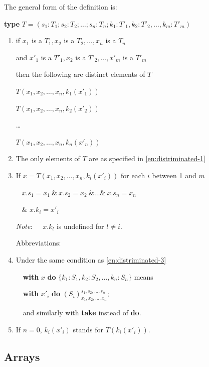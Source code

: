 \documentclass[twoside,11pt]{book}
\begin{document}
The general form of the definition is:

\quad \textbf{type} $T = (s_1: T_1; s_2: T_2; \dots ; s_n:T_n; k_1: T'_1, k_2:T'_2, \dots , k_m: T'_m)$

\begin{enumerate}[wide, nosep, label=(\arabic*)]
	\item \label{en:distriminated-1}
	if $x_1$ is a $T_1, x_2$ is a $T_2, \dots, x_n$ is a $T_n$
	
	and $x'_1$ is a $T'_1, x_2$ is a $T'_2, \dots, x'_m$ is a $T'_m$
	
	then the following are distinct elements of $T$
	
	$T(x_1, x_2, \dots, x_n, k_1(x'_1))$
	
	$T(x_1, x_2, \dots, x_n, k_2(x'_2))$
	
	\quad \dots
	
	$T(x_1, x_2, \dots, x_n, k_n(x'_n))$

	\item The only elements of $T$ are as specified in \ref{en:distriminated-1}
	
	\item\label{en:distriminated-3}
	If $x = T(x_1, x_2, \dots, x_n, k_i(x'_i))$ for each $i$ between 1 and $m$
	
	\qquad~ $x.s_1 = x_1\ \&\ x.s_2 = x_2\ \& \dots \&\ x.s_n = x_n$
	
	\quad~ \& $x.k_i = x'_i$

	\noindent
	\textit{Note}:\quad~~\, $x.k_l$ is undefined for $l \neq i.$
	
	\noindent
	Abbreviations:
	
	\item Under the same condition as \ref{en:distriminated-3} 
	
	\quad~\, \textbf{with} $x$ \textbf{do} $\{k_1:S_1, k_2:S_2, \dots, k_n:S_n\}$ means

	\quad~\, \textbf{with} $x'_i$ \textbf{do} $(S_i)_{x_1, x_2, \dots, x_n}^{s_1, s_2, \dots, s_n}$;

	\quad~\, and similarly with \textbf{take} instead of \textbf{do}.

	\item If $n = 0$, $k_i(x'_i)$ stands for $T(k_i(x'_i)).$
\end{enumerate}

\subsection{Arrays}
\end{document}
